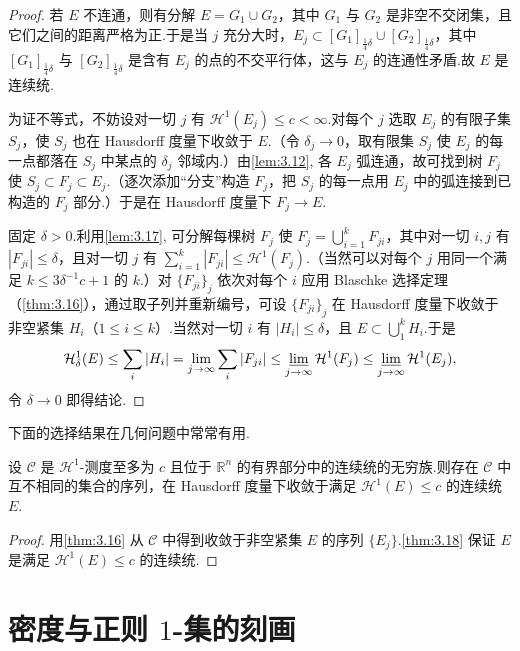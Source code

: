 \begin{proof}
若 $E$ 不连通，则有分解 $E=G_1\cup G_2$，其中 $G_1$ 与 $G_2$ 是非空不交闭集，且它们之间的距离严格为正.于是当 $j$ 充分大时，$E_j\subset[G_1]_{\frac{1}{4}\delta}\cup[G_2]_{\frac{1}{4}\delta}$，其中 $[G_1]_{\frac{1}{4}\delta}$ 与 $[G_2]_{\frac{1}{4}\delta}$ 是含有 $E_j$ 的点的不交平行体，这与 $E_j$ 的连通性矛盾.故 $E$ 是连续统.

为证不等式，不妨设对一切 $j$ 有 $\mathcal{H}^1(E_j)\leq c<\infty$.对每个 $j$ 选取 $E_j$ 的有限子集 $S_j$，使 $S_j$ 也在 Hausdorff 度量下收敛于 $E$.（令 $\delta_j\to 0$，取有限集 $S_j$ 使 $E_j$ 的每一点都落在 $S_j$ 中某点的 $\delta_j$ 邻域内.）由\cref{lem:3.12}, 各 $E_j$ 弧连通，故可找到树 $F_j$ 使 $S_j\subset F_j\subset E_j$.（逐次添加``分支''构造 $F_j$，把 $S_j$ 的每一点用 $E_j$ 中的弧连接到已构造的 $F_j$ 部分.）于是在 Hausdorff 度量下 $F_j\to E$.

固定 $\delta>0$.利用\cref{lem:3.17}, 可分解每棵树 $F_j$ 使 $F_j=\bigcup_{i=1}^{k}F_{ji}$，其中对一切 $i,j$ 有 $|F_{ji}|\leq\delta$，且对一切 $j$ 有 $\sum_{i=1}^{k}|F_{ji}|\leq\mathcal{H}^1(F_j)$.（当然可以对每个 $j$ 用同一个满足 $k\leq 3\delta^{-1}c+1$ 的 $k$.）对 $\{F_{ji}\}_j$ 依次对每个 $i$ 应用 Blaschke 选择定理（\cref{thm:3.16}），通过取子列并重新编号，可设 $\{F_{ji}\}_j$ 在 Hausdorff 度量下收敛于非空紧集 $H_i$（$1\leq i\leq k$）.当然对一切 $i$ 有 $|H_i|\leq\delta$，且 $E\subset\bigcup_{1}^{k}H_i$.于是
\[
  \mathcal{H}^{1}_{\delta}(E)\leq\sum_{i}|H_i|
  =\lim_{j\to\infty}\sum_{i}|F_{ji}|
  \leq\varliminf_{j\to\infty}\mathcal{H}^{1}(F_j)
  \leq\varliminf_{j\to\infty}\mathcal{H}^{1}(E_j),
\]
令 $\delta\to 0$ 即得结论.
\end{proof}

下面的选择结果在几何问题中常常有用.


\begin{corollary}\label{cor:3.19}
设 $\mathcal{C}$ 是 $\mathcal{H}^1$-测度至多为 $c$ 且位于 $\mathbb{R}^n$ 的有界部分中的连续统的无穷族.则存在 $\mathcal{C}$ 中互不相同的集合的序列，在 Hausdorff 度量下收敛于满足 $\mathcal{H}^1(E)\leq c$ 的连续统 $E$.
\end{corollary}

\begin{proof}
用\cref{thm:3.16} 从 $\mathcal{C}$ 中得到收敛于非空紧集 $E$ 的序列 $\{E_j\}$.\cref{thm:3.18} 保证 $E$ 是满足 $\mathcal{H}^1(E)\leq c$ 的连续统.
\end{proof}

\section{密度与正则 $1$-集的刻画}

